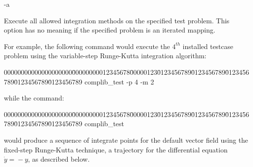 \hspace{.25in}\parbox[b]{.5in}{-a}
\parbox[t]{4.6in}{  
Execute all allowed integration methods on the specified test problem.  This option 
has no meaning if the specified problem is an iterated mapping.
}
\bigskip
\bigskip

\noindent For example, the following command would execute the $4^{th}$ installed testcase
problem using the variable-step Runge-Kutta integration algorithm:
\begin{tabbing}
00000000000000000000\=00000000012345678\=00000123\=0123456789\=0123456789\=0123456789\=0123456789\=0123456789 \kill
\> complib\_test -p 4 -m 2
\end{tabbing}
while the command:
\begin{tabbing}
00000000000000000000\=00000000012345678\=00000123\=0123456789\=0123456789\=0123456789\=0123456789\=0123456789 \kill
\> complib\_test 
\end{tabbing}
would produce a sequence of integrate points for the default vector field using the fixed-step Runge-Kutta
technique, a trajectory for the differential equation $\dot{y} \! = \! -y$, as described below.




\clearpage





